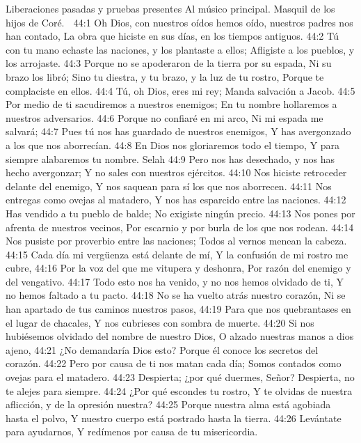 Liberaciones pasadas y pruebas presentes 
Al músico principal. Masquil de los hijos de Coré. 

44:1 Oh Dios, con nuestros oídos hemos oído, nuestros padres nos han contado, 
La obra que hiciste en sus días, en los tiempos antiguos. 
44:2 Tú con tu mano echaste las naciones, y los plantaste a ellos; 
Afligiste a los pueblos, y los arrojaste. 
44:3 Porque no se apoderaron de la tierra por su espada, 
Ni su brazo los libró; 
Sino tu diestra, y tu brazo, y la luz de tu rostro, 
Porque te complaciste en ellos. 
44:4 Tú, oh Dios, eres mi rey; 
Manda salvación a Jacob. 
44:5 Por medio de ti sacudiremos a nuestros enemigos; 
En tu nombre hollaremos a nuestros adversarios. 
44:6 Porque no confiaré en mi arco, 
Ni mi espada me salvará; 
44:7 Pues tú nos has guardado de nuestros enemigos, 
Y has avergonzado a los que nos aborrecían. 
44:8 En Dios nos gloriaremos todo el tiempo, 
Y para siempre alabaremos tu nombre. Selah 
44:9 Pero nos has desechado, y nos has hecho avergonzar; 
Y no sales con nuestros ejércitos. 
44:10 Nos hiciste retroceder delante del enemigo, 
Y nos saquean para sí los que nos aborrecen. 
44:11 Nos entregas como ovejas al matadero, 
Y nos has esparcido entre las naciones. 
44:12 Has vendido a tu pueblo de balde; 
No exigiste ningún precio. 
44:13 Nos pones por afrenta de nuestros vecinos, 
Por escarnio y por burla de los que nos rodean. 
44:14 Nos pusiste por proverbio entre las naciones; 
Todos al vernos menean la cabeza. 
44:15 Cada día mi vergüenza está delante de mí, 
Y la confusión de mi rostro me cubre, 
44:16 Por la voz del que me vitupera y deshonra, 
Por razón del enemigo y del vengativo. 
44:17 Todo esto nos ha venido, y no nos hemos olvidado de ti, 
Y no hemos faltado a tu pacto. 
44:18 No se ha vuelto atrás nuestro corazón, 
Ni se han apartado de tus caminos nuestros pasos, 
44:19 Para que nos quebrantases en el lugar de chacales, 
Y nos cubrieses con sombra de muerte. 
44:20 Si nos hubiésemos olvidado del nombre de nuestro Dios, 
O alzado nuestras manos a dios ajeno, 
44:21 ¿No demandaría Dios esto? 
Porque él conoce los secretos del corazón. 
44:22 Pero por causa de ti nos matan cada día; 
Somos contados como ovejas para el matadero. 
44:23 Despierta; ¿por qué duermes, Señor? 
Despierta, no te alejes para siempre. 
44:24 ¿Por qué escondes tu rostro, 
Y te olvidas de nuestra aflicción, y de la opresión nuestra? 
44:25 Porque nuestra alma está agobiada hasta el polvo, 
Y nuestro cuerpo está postrado hasta la tierra. 
44:26 Levántate para ayudarnos, 
Y redímenos por causa de tu misericordia. 

